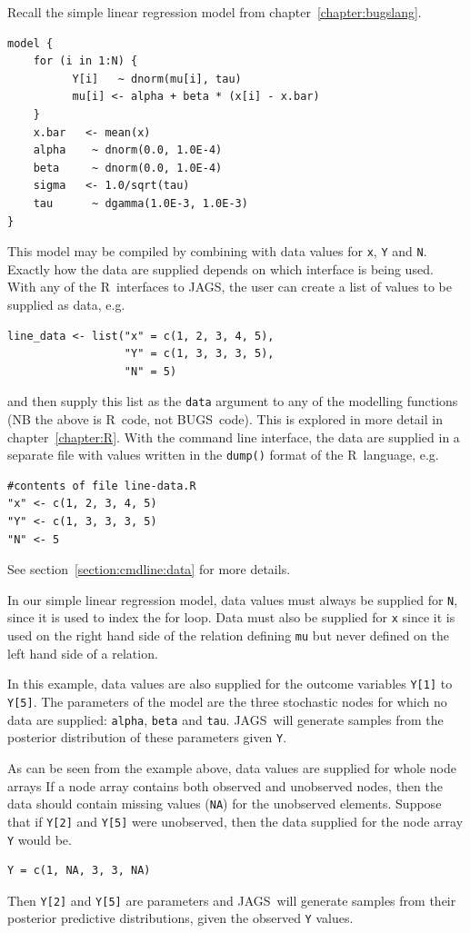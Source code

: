 \documentclass[11pt, a4paper, titlepage]{report}
\newcommand{\JAGS}{\textsf{JAGS}}
\newcommand{\BUGS}{\textsf{BUGS}}
\newcommand{\R}{\textsf{R}}
\begin{document}
Recall the simple linear regression model from
chapter~\ref{chapter:bugslang}.
\begin{verbatim}
model {
    for (i in 1:N) {
          Y[i]   ~ dnorm(mu[i], tau)
          mu[i] <- alpha + beta * (x[i] - x.bar)
    }
    x.bar   <- mean(x)
    alpha    ~ dnorm(0.0, 1.0E-4)
    beta     ~ dnorm(0.0, 1.0E-4)
    sigma   <- 1.0/sqrt(tau)
    tau      ~ dgamma(1.0E-3, 1.0E-3)
}
\end{verbatim}
This model may be compiled by combining with data values for \texttt{x},
\texttt{Y} and \texttt{N}. Exactly how the data are supplied depends
on which interface is being used. With any of the \R\ interfaces to \JAGS,
the user can create a list of values to be supplied as data, e.g.
\begin{verbatim}
line_data <- list("x" = c(1, 2, 3, 4, 5),
                  "Y" = c(1, 3, 3, 3, 5),
                  "N" = 5)
\end{verbatim}
and then supply this list as the \texttt{data} argument to any of the
modelling functions (NB the above is \R\ code, not \BUGS\ code). This
is explored in more detail in chapter~\ref{chapter:R}. With the command
line interface, the data are supplied in a separate file with values
written in the \texttt{dump()} format of the \R\ language, e.g.
\begin{verbatim}
#contents of file line-data.R
"x" <- c(1, 2, 3, 4, 5)
"Y" <- c(1, 3, 3, 3, 5)
"N" <- 5
\end{verbatim}
See section~\ref{section:cmdline:data} for more details.

In our simple linear regression model, data values must always be
supplied for \texttt{N}, since it is used to index the for loop.  Data
must also be supplied for \texttt{x} since it is used on the right hand 
side of the relation defining \texttt{mu} but never defined on the left 
hand side of a relation.


In this example, data values are also supplied for the outcome
variables \verb+Y[1]+ to \verb+Y[5]+. The parameters of the model are
the three stochastic nodes for which no data are supplied:
\texttt{alpha}, \texttt{beta} and \texttt{tau}.  \JAGS\ will generate
samples from the posterior distribution of these parameters given
\texttt{Y}.

As can be seen from the example above, data values are supplied for
whole node arrays If a node array contains both observed and
unobserved nodes, then the data should contain missing values
(\texttt{NA}) for the unobserved elements. Suppose that if \verb+Y[2]+
and \verb+Y[5]+ were unobserved, then the data supplied for the
node array \texttt{Y} would be.
\begin{verbatim}
Y = c(1, NA, 3, 3, NA)
\end{verbatim}
Then \verb+Y[2]+ and \verb+Y[5]+ are parameters and \JAGS\ will
generate samples from their posterior predictive distributions, given
the observed \texttt{Y} values.
\end{document}
